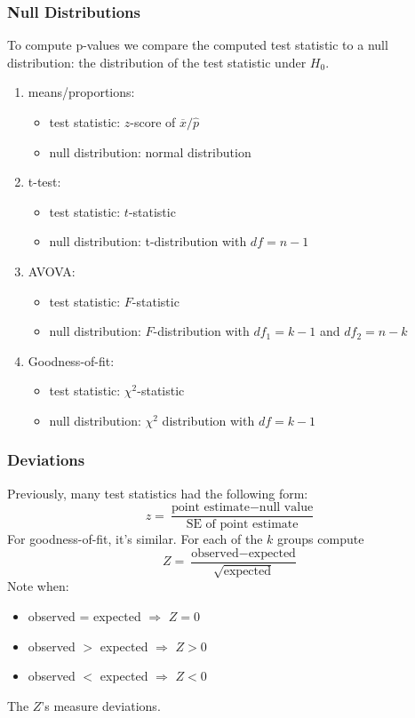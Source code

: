 \documentclass[handout]{beamer}
\newcommand{\blue}[1]{\textcolor{blue2}{#1}}
\newcommand{\xbar}{\overline{x}}
\begin{document}
\begin{frame}[fragile]
\frametitle{Null Distributions}
To compute p-values we compare the \blue{computed test statistic} to a \blue{null distribution}:  the distribution of the test statistic under $H_0$.

\begin{enumerate}
\pause\item \blue{means/proportions}:
\begin{itemize}
\item test statistic: $z$-score of $\xbar / \widehat{p}$
\item null distribution: normal distribution
\end{itemize}
\pause\item \blue{t-test}:  
\begin{itemize}
\item test statistic: $t$-statistic
\item null distribution: t-distribution with $df=n-1$
\end{itemize}
\pause\item \blue{AVOVA}:  
\begin{itemize}
\item test statistic: $F$-statistic 
\item null distribution: $F$-distribution with $df_1=k-1$ and $df_2 = n-k$
\end{itemize}
\pause\item \blue{Goodness-of-fit}:
\begin{itemize}
\item test statistic: $\chi^2$-statistic
\item null distribution: $\chi^2$ distribution with $df=k-1$
\end{itemize}
\end{enumerate}

\end{frame}


\begin{frame}[fragile]
\frametitle{Deviations}
%
%
Previously, many test statistics had the following form:  
\[
z = \frac{\mbox{point estimate} - \mbox{null value}}{\mbox{SE of point estimate}}
\]
\pause For goodness-of-fit, it's similar.  For each of the $k$ groups compute
\[
Z = \frac{\mbox{observed} - \mbox{expected}}{\sqrt{\mbox{expected}}}
\]
\pause Note when:
\begin{itemize}
\item observed = expected $\Rightarrow$ $Z=0$
\item observed $>$ expected $\Rightarrow$ $Z>0$
\item observed $<$ expected $\Rightarrow$ $Z<0$
\end{itemize}

 The $Z$'s measure deviations.
\end{frame}
\end{document}
